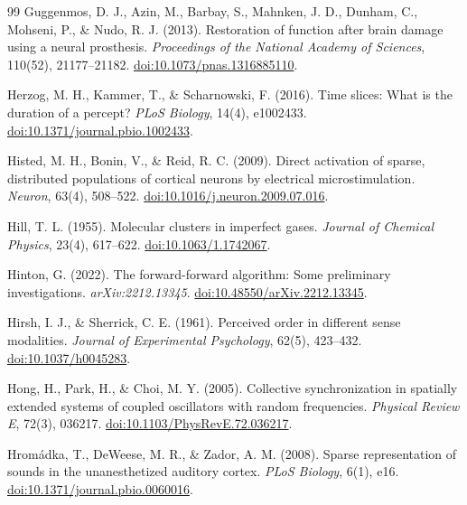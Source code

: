 \begin{thebibliography}{99}
 Guggenmos, D. J., Azin, M., Barbay, S., Mahnken, J. D., Dunham, C., Mohseni, P., \& Nudo, R. J. (2013). Restoration of function after brain damage using a neural prosthesis. \textit{Proceedings of the National Academy of Sciences}, 110(52), 21177--21182. \href{https://doi.org/10.1073/pnas.1316885110}{doi:10.1073/pnas.1316885110}.

 Herzog, M. H., Kammer, T., \& Scharnowski, F. (2016). Time slices: What is the duration of a percept? \textit{PLoS Biology}, 14(4), e1002433. \href{https://doi.org/10.1371/journal.pbio.1002433}{doi:10.1371/journal.pbio.1002433}.

 Histed, M. H., Bonin, V., \& Reid, R. C. (2009). Direct activation of sparse, distributed populations of cortical neurons by electrical microstimulation. \textit{Neuron}, 63(4), 508--522. \href{https://doi.org/10.1016/j.neuron.2009.07.016}{doi:10.1016/j.neuron.2009.07.016}.

 Hill, T. L. (1955). Molecular clusters in imperfect gases. \textit{Journal of Chemical Physics}, 23(4), 617--622. \href{https://doi.org/10.1063/1.1742067}{doi:10.1063/1.1742067}.

 Hinton, G. (2022). The forward-forward algorithm: Some preliminary investigations. \textit{arXiv:2212.13345}. \href{https://doi.org/10.48550/arXiv.2212.13345}{doi:10.48550/arXiv.2212.13345}.

 Hirsh, I. J., \& Sherrick, C. E. (1961). Perceived order in different sense modalities. \textit{Journal of Experimental Psychology}, 62(5), 423--432. \href{https://doi.org/10.1037/h0045283}{doi:10.1037/h0045283}.

 Hong, H., Park, H., \& Choi, M. Y. (2005). Collective synchronization in spatially extended systems of coupled oscillators with random frequencies. \textit{Physical Review E}, 72(3), 036217. \href{https://doi.org/10.1103/PhysRevE.72.036217}{doi:10.1103/PhysRevE.72.036217}.

 Hrom\'{a}dka, T., DeWeese, M. R., \& Zador, A. M. (2008). Sparse representation of sounds in the unanesthetized auditory cortex. \textit{PLoS Biology}, 6(1), e16. \href{https://doi.org/10.1371/journal.pbio.0060016}{doi:10.1371/journal.pbio.0060016}.


\end{thebibliography}
